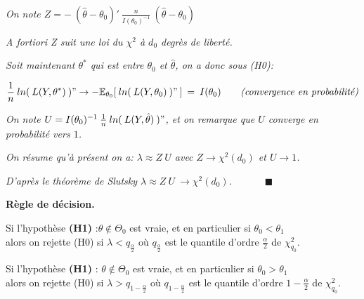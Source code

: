 \documentclass[11pt,fleqn]{book} %
\begin{document}
\textit{On note $Z=-\:(\hat{\theta}-\theta_0)'\:\frac{n}{I(\theta_0)^{-1}}\:(\hat{\theta}-\theta_0)$}

\vspace{1em}

\textit{A fortiori Z suit une loi du $\chi^2$ à $d_0$ degrès de liberté.} 

\vspace{2em}

\textit{Soit maintenant $\theta^{*}$ qui est entre $\theta_0$ et $\hat{\theta}$, on a donc sous (H0):}

\[
\frac{1}{n}\:ln(\:L(Y,\theta^{*})\:)" \rightarrow -\mathbb{E}_{\theta_0}[\:ln(\:L(Y,\theta_0)\:)"\:]\:=\:I(\theta_0) \qquad \textit{(convergence en probabilité)}
\]

\vspace{0.5em}

\textit{On note $U=I(\theta_0)^{-1}\:\frac{1}{n}\:ln(\:L(Y,\hat{\theta})\:)"$, et on remarque que $U$ converge en probabilité vers $1$.}

\vspace{1em}

\textit{On résume qu'à présent on a: $\lambda\approx Z\:U$ avec\: $Z\rightarrow\chi^2(d_0)$ \:et\: $U\rightarrow 1$.}

\vspace{1em}

\textit{D'après le théorème de Slutsky  \:$\lambda\approx Z\:U \:\rightarrow \chi^2(d_0)$.} $\quad\quad\quad \blacksquare$ 

\vspace{2em}

\textbf{Règle de décision.}

\vspace{1em}

Si l'hypothèse \textbf{(H1)} :\:$ \theta \notin \Theta_0 $ est vraie, et en particulier si $\theta_0 < \theta_1$\\
alors on rejette (H0) si \: $\lambda < q_{\frac{\alpha}{2}}$ \:où\: $q_{\frac{\alpha}{2}}$ est le quantile d'ordre $\frac{\alpha}{2}$ de $\chi_{q_0}^2$.

\vspace{1em}

Si l'hypothèse \textbf{(H1)} :\: $ \theta \notin \Theta_0 $ est vraie, et en particulier si $\theta_0 > \theta_1$\\
alors on rejette (H0) si \: $\lambda > q_{1-\frac{\alpha}{2}}$ \:où\: $q_{1-\frac{\alpha}{2}}$ est le quantile d'ordre $1-\frac{\alpha}{2}$ de $\chi_{q_0}^2$.
\end{document}
